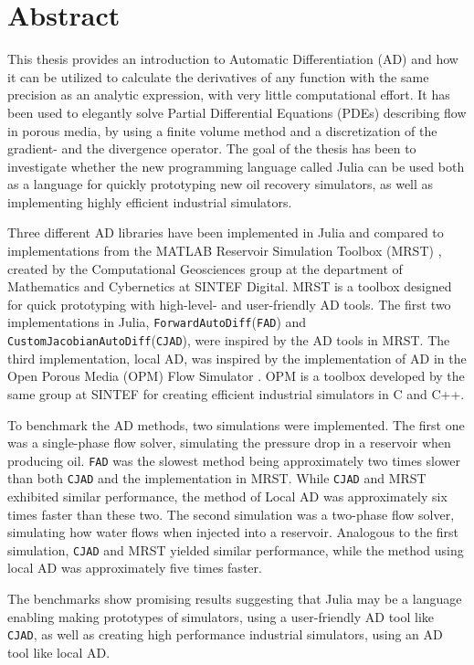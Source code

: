 \chapter*{Abstract}
This thesis provides an introduction to Automatic Differentiation (AD) and how it can be utilized to calculate the derivatives of any function with the same precision as an analytic expression, with very little computational effort. It has been used to elegantly solve Partial Differential Equations (PDEs) describing flow in porous media, by using a finite volume method and a discretization of the gradient- and the divergence operator. The goal of the thesis has been to investigate whether the new programming language called Julia can be used both as a language for quickly prototyping new oil recovery simulators, as well as implementing highly efficient industrial simulators.

Three different AD libraries have been implemented in Julia and compared to implementations from the MATLAB Reservoir Simulation Toolbox (MRST) \emph{\citep{mrstHomepage}}, created by the Computational Geosciences  group  at  the  department  of  Mathematics  and  Cybernetics  at  SINTEF Digital. MRST is a toolbox designed for quick prototyping with high-level- and user-friendly AD tools. The first two implementations in Julia, \texttt{ForwardAutoDiff}(\texttt{FAD}) and \texttt{CustomJacobianAutoDiff}(\texttt{CJAD}), were inspired by the AD tools in MRST. The third implementation, local AD, was inspired by the implementation of AD in the Open Porous Media (OPM) Flow Simulator \emph{\citep{opm}}. OPM is a toolbox developed by the same group at SINTEF for creating efficient industrial simulators in C and C++. 

To benchmark the AD methods, two simulations were implemented. The first one was a single-phase flow solver, simulating the pressure drop in a reservoir when producing oil. \texttt{FAD} was the slowest method being approximately two times slower than both \texttt{CJAD} and the implementation in MRST. While \texttt{CJAD} and MRST exhibited similar performance, the method of Local AD was approximately six times faster than these two. The second simulation was a two-phase flow solver, simulating how water flows when injected into a reservoir. Analogous to the first simulation, \texttt{CJAD} and MRST yielded similar performance, while the method using local AD was approximately five times faster.

The benchmarks show promising results suggesting that Julia may be a language enabling making prototypes of simulators, using a user-friendly AD tool like \texttt{CJAD}, as well as creating high performance industrial simulators, using an AD tool like local AD.